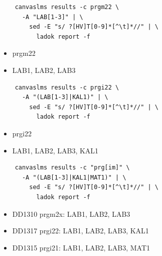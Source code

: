 \begin{frame}[fragile]
  \begin{verbatim}
    canvaslms results -c prgm22 \
      -A "LAB[1-3]" | \
        sed -E "s/ ?[HV]T[0-9]*[^\t]*//" | \
          ladok report -f
  \end{verbatim}

  \begin{example}[Matching]
    \begin{itemize}
      \item prgm22
      \item LAB1, LAB2, LAB3
    \end{itemize}
  \end{example}
\end{frame}

\begin{frame}[fragile]
  \begin{verbatim}
    canvaslms results -c prgi22 \
      -A "(LAB[1-3]|KAL1)" | \
        sed -E "s/ ?[HV]T[0-9]*[^\t]*//" | \
          ladok report -f
  \end{verbatim}

  \begin{example}[Matching]
    \begin{itemize}
      \item prgi22
      \item LAB1, LAB2, LAB3, KAL1
    \end{itemize}
  \end{example}
\end{frame}

\begin{frame}[fragile]
  \begin{verbatim}
    canvaslms results -c "prg[im]" \
      -A "(LAB[1-3]|KAL1|MAT1)" | \
        sed -E "s/ ?[HV]T[0-9]*[^\t]*//" | \
          ladok report -f
  \end{verbatim}

  \begin{example}[Matching]
    \begin{itemize}
      \item DD1310 prgm2x: LAB1, LAB2, LAB3
      \item DD1317 prgi22: LAB1, LAB2, LAB3, KAL1
      \item DD1315 prgi21: LAB1, LAB2, LAB3, MAT1
    \end{itemize}
  \end{example}
\end{frame}

